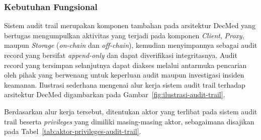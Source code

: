 \subsubsection{Kebutuhan Fungsional}

Sistem audit trail merupakan komponen tambahan pada arsitektur DecMed yang bertugas mengumpulkan aktivitas yang terjadi pada komponen \textit{Client}, \textit{Proxy}, maupun \textit{Storage} (\textit{on-chain} dan \textit{off-chain}), kemudian menyimpannya sebagai audit record yang bersifat \textit{append-only} dan dapat diverifikasi integritasnya. Audit record yang tersimpan selanjutnya dapat diakses melalui antarmuka pencarian oleh pihak yang berwenang untuk keperluan audit maupun investigasi insiden keamanan. Ilustrasi sederhana mengenai alur kerja sistem audit trail terhadap arsitektur DecMed digambarkan pada Gambar~\ref{fig:ilustrasi-audit-trail}.


Berdasarkan alur kerja tersebut, ditentukan aktor yang terlibat pada sistem audit trail beserta \textit{privileges} yang dimiliki masing-masing aktor, sebagaimana disajikan pada Tabel~\ref{tab:aktor-privileges-audit-trail}.

